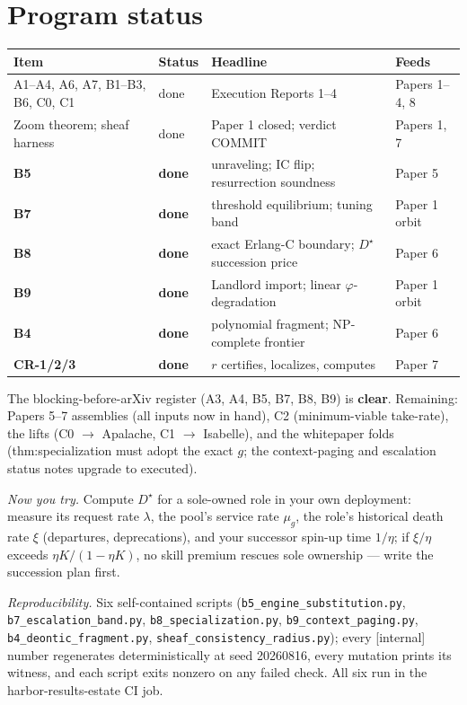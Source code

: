 \documentclass[11pt,a4paper]{article}
\begin{document}
\section{Program status}
\begin{center}
\begin{tabular}{@{}llll@{}}
\toprule
Item & Status & Headline & Feeds \\
\midrule
A1--A4, A6, A7, B1--B3, B6, C0, C1 & done & Execution Reports 1--4 & Papers 1--4, 8 \\
Zoom theorem; sheaf harness & done & Paper 1 closed; verdict COMMIT & Papers 1, 7 \\
\textbf{B5} & \textbf{done} & unraveling; IC flip; resurrection soundness & Paper 5 \\
\textbf{B7} & \textbf{done} & threshold equilibrium; tuning band & Paper 1 orbit \\
\textbf{B8} & \textbf{done} & exact Erlang-C boundary; $D^\star$ succession price & Paper 6 \\
\textbf{B9} & \textbf{done} & Landlord import; linear $\varphi$-degradation & Paper 1 orbit \\
\textbf{B4} & \textbf{done} & polynomial fragment; NP-complete frontier & Paper 6 \\
\textbf{CR-1/2/3} & \textbf{done} & $r$ certifies, localizes, computes & Paper 7 \\
\bottomrule
\end{tabular}
\end{center}
The blocking-before-arXiv register (A3, A4, B5, B7, B8, B9) is \textbf{clear}. Remaining: Papers 5--7 assemblies (all inputs now in hand), C2 (minimum-viable take-rate), the lifts (C0 $\to$ Apalache, C1 $\to$ Isabelle), and the whitepaper folds (thm:specialization must adopt the exact $g$; the context-paging and escalation status notes upgrade to executed).

\vspace{0.4em}
\noindent\emph{Now you try.} Compute $D^\star$ for a sole-owned role in your own deployment: measure its request rate $\lambda$, the pool's service rate $\mu_g$, the role's historical death rate $\xi$ (departures, deprecations), and your successor spin-up time $1/\eta$; if $\xi/\eta$ exceeds $\eta K/(1-\eta K)$, no skill premium rescues sole ownership --- write the succession plan first.

\vspace{0.4em}
\noindent\emph{Reproducibility.} Six self-contained scripts (\texttt{b5\_engine\_substitution.py}, \texttt{b7\_escalation\_band.py}, \texttt{b8\_specialization.py}, \texttt{b9\_context\_paging.py}, \texttt{b4\_deontic\_fragment.py}, \texttt{sheaf\_consistency\_radius.py}); every [internal] number regenerates deterministically at seed 20260816, every mutation prints its witness, and each script exits nonzero on any failed check. All six run in the harbor-results-estate CI job.
\end{document}

